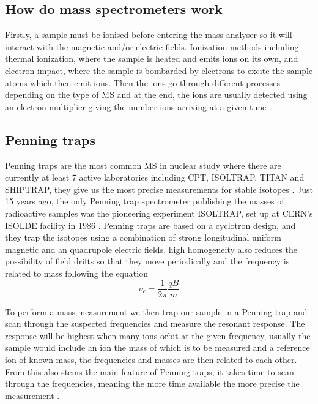 \subsection{How do mass spectrometers work}
Firstly, a sample must be ionised before entering the mass analyser so it will interact with the magnetic and/or electric fields.
Ionization methods including thermal ionization, where the sample is heated and emits ions on its own, and electron impact, where the sample is bombarded by electrons to excite the sample atoms which then emit ions.
Then the ions go through different processes depending on the type of MS and at the end, the ions are usually detected using an electron multiplier giving the number ions arriving at a given time \cite{noauthor_mass_nodate}.

\subsection{Penning traps}
Penning traps are the most common MS in nuclear study where there are currently at least 7 active laboratories including CPT, ISOLTRAP, TITAN and SHIPTRAP, they give us the most precise measurements for stable isotopes \cite{huang_ame_2021}.
Just 15 years ago, the only Penning trap spectrometer publishing the masses of radioactive samples was the pioneering experiment ISOLTRAP, set up at CERN’s ISOLDE facility in 1986 \cite{lunney_new_2019}. %
Penning traps are based on a cyclotron design, and they trap the isotopes using a combination of strong longitudinal uniform magnetic and an quadrupole electric fields, high homogeneity also reduces the possibility of field drifts so that they move periodically and the frequency is related to mass following the equation
\begin{equation}
    \nu_c = \frac{1}{2\pi}\frac{qB}{m}
\end{equation}

To perform a mass measurement we then trap our sample in a Penning trap and scan through the suspected frequencies and measure the resonant response.
The response will be highest when many ions orbit at the given frequency, usually the sample would include an ion the mass of which is to be measured and a reference ion of known mass, the frequencies and masses are then related to each other.
From this also stems the main feature of Penning traps, it takes time to scan through the frequencies, meaning the more time available the more precise the measurement \cite{konig_quadrupole_1995}.


